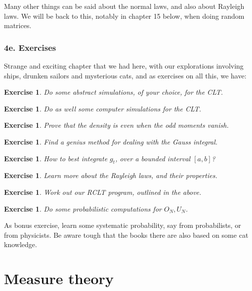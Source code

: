 \documentclass[12pt]{amsbook}
\newtheorem{exercise}[theorem]{Exercise}
\begin{document}
Many other things can be said about the normal laws, and also about Rayleigh laws. We will be back to this, notably in chapter 15 below, when doing random matrices.

\section*{4e. Exercises}

Strange and exciting chapter that we had here, with our explorations involving ships, drunken sailors and mysterious cats, and as exercises on all this, we have:

\begin{exercise}
Do some abstract simulations, of your choice, for the CLT.
\end{exercise}

\begin{exercise}
Do as well some computer simulations for the CLT.
\end{exercise}

\begin{exercise}
Prove that the density is even when the odd moments vanish.
\end{exercise}

\begin{exercise}
Find a genius method for dealing with the Gauss integral.
\end{exercise}

\begin{exercise}
How to best integrate $g_t$, over a bounded interval $[a,b]$?
\end{exercise}

\begin{exercise}
Learn more about the Rayleigh laws, and their properties.
\end{exercise}

\begin{exercise}
Work out our RCLT program, outlined in the above.
\end{exercise}

\begin{exercise}
Do some probabilistic computations for $O_N,U_N$.
\end{exercise}

As bonus exercise, learn some systematic probability, say from probabilists, or from physicists. Be aware tough that the books there are also based on some cat knowledge.

\part{Measure theory}
\end{document}
